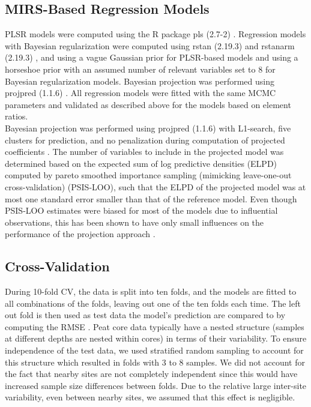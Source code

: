 \documentclass[draft,linenumbers]{agujournal2018}
\begin{document}
\subsection{MIRS-Based Regression Models}

PLSR models were computed using the R package pls (2.7-2)
\citep{Mevik.2019}. Regression models with Bayesian regularization were
computed using rstan (2.19.3) \citep{StanDevelopmentTeam.2020} and
rstanarm (2.19.3) \citep{Goodrich.2020}, and using a vague Gaussian
prior for PLSR-based models and using a horseshoe prior with an assumed
number of relevant variables set to 8 \citep{Piironen.2017c} for
Bayesian regularization models. Bayesian projection was performed using
projpred (1.1.6) \citep{Piironen.2019}. All regression models were
fitted with the same MCMC parameters and validated as described above
for the models based on element ratios.\\
Bayesian projection was performed using projpred (1.1.6)
\citep{Piironen.2019} with L1-search, five clusters for prediction, and
no penalization during computation of projected coefficients
\citep{Piironen.2019, Piironen.2020}. The number of variables to include
in the projected model was determined based on the expected sum of log
predictive densities (ELPD) computed by pareto smoothed importance
sampling (mimicking leave-one-out cross-validation) (PSIS-LOO), such
that the ELPD of the projected model was at most one standard error
smaller than that of the reference model. Even though PSIS-LOO estimates
were biased for most of the models due to influential observations, this
has been shown to have only small influences on the performance of the
projection approach \citep{Piironen.2020}.

\subsection{Cross-Validation}

During 10-fold CV, the data is split into ten folds, and the models are
fitted to all combinations of the folds, leaving out one of the ten
folds each time. The left out fold is then used as test data the model's
prediction are compared to by computing the RMSE \citep{Roberts.2017}.
Peat core data typically have a nested structure (samples at different
depths are nested within cores) in terms of their variability. To ensure
independence of the test data, we used stratified random sampling to
account for this structure \citep{Roberts.2017} which resulted in folds
with 3 to 8 samples. We did not account for the fact that nearby sites
are not completely independent since this would have increased sample
size differences between folds. Due to the relative large inter-site
variability, even between nearby sites, we assumed that this effect is
negligible.
\end{document}
